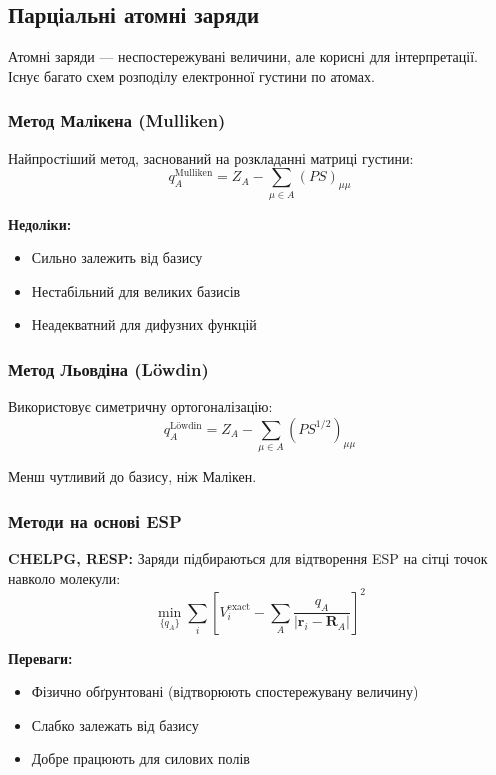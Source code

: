 \subsection{Парціальні атомні заряди}

Атомні заряди --- неспостережувані величини, але корисні для інтерпретації.
Існує багато схем розподілу електронної густини по атомах.

\subsubsection{Метод Малікена (Mulliken)}

Найпростіший метод, заснований на розкладанні матриці густини:
\[
q_A^{\text{Mulliken}} = Z_A - \sum_{\mu \in A} (PS)_{\mu\mu}
\]

\textbf{Недоліки:}
\begin{itemize}
    \item Сильно залежить від базису
    \item Нестабільний для великих базисів
    \item Неадекватний для дифузних функцій
\end{itemize}

\subsubsection{Метод Льовдіна (Löwdin)}

Використовує симетричну ортогоналізацію:
\[
q_A^{\text{Löwdin}} = Z_A - \sum_{\mu \in A} (PS^{1/2})_{\mu\mu}
\]

Менш чутливий до базису, ніж Малікен.

\subsubsection{Методи на основі ESP}

\textbf{CHELPG, RESP:} Заряди підбираються для відтворення ESP
на сітці точок навколо молекули:
\[
\min_{\{q_A\}} \sum_i \left[V_i^{\text{exact}} -
\sum_A \frac{q_A}{|\mathbf{r}_i - \mathbf{R}_A|}\right]^2
\]

\textbf{Переваги:}
\begin{itemize}
    \item Фізично обґрунтовані (відтворюють спостережувану величину)
    \item Слабко залежать від базису
    \item Добре працюють для силових полів
\end{itemize}

